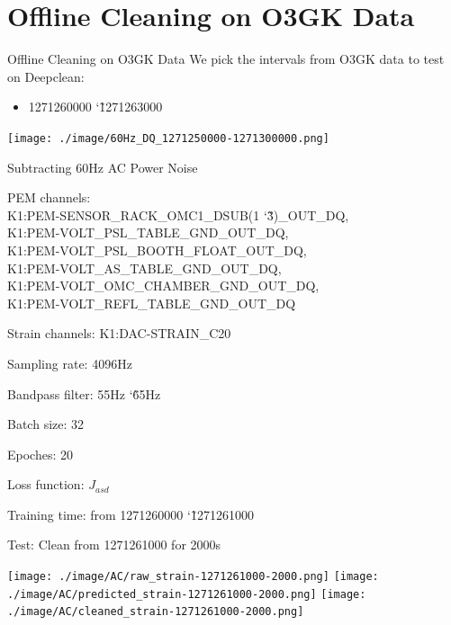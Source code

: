 \documentclass[xcolor=dvipsnames]{beamer}
\begin{document}
\section[Offline Deepclean]{Offline Cleaning on O3GK Data}

\begin{frame}[t]{Offline Cleaning on O3GK Data}
	We pick the intervals from O3GK data to test on Deepclean:
	\begin{itemize}
		\item 1271260000 \char`\~ 1271263000
	\end{itemize}
	\begin{center}
		\texttt{[image: ./image/60Hz\_DQ\_1271250000-1271300000.png]}
	\end{center}
\end{frame}

\begin{frame}[t]{Subtracting 60Hz AC Power Noise}
	\begin{itemize}
  {\footnotesize{
    \item PEM channels: \\
      K1:PEM-SENSOR\_RACK\_OMC1\_DSUB(1 \char`\~ 3)\_OUT\_DQ, \\
      K1:PEM-VOLT\_PSL\_TABLE\_GND\_OUT\_DQ, \\
      K1:PEM-VOLT\_PSL\_BOOTH\_FLOAT\_OUT\_DQ, \\
      K1:PEM-VOLT\_AS\_TABLE\_GND\_OUT\_DQ, \\
      K1:PEM-VOLT\_OMC\_CHAMBER\_GND\_OUT\_DQ, \\
      K1:PEM-VOLT\_REFL\_TABLE\_GND\_OUT\_DQ
    \item Strain channels: K1:DAC-STRAIN\_C20
    \item Sampling rate: 4096Hz
    \item Bandpass filter: 55Hz \char`\~ 65Hz
    \item Batch size: 32
    \item Epoches: 20
    \item Loss function: $J_{asd}$
    \item Training time: from {\color{blue}1271260000 \char`\~ 1271261000}
  }}
  \end{itemize}
\end{frame}

\begin{frame}[t]{Test: Clean from 1271261000 for 2000s}
	\begin{center}
		\texttt{[image: ./image/AC/raw\_strain-1271261000-2000.png]}
		\texttt{[image: ./image/AC/predicted\_strain-1271261000-2000.png]}
		\texttt{[image: ./image/AC/cleaned\_strain-1271261000-2000.png]}
	\end{center}
\end{frame}
\end{document}

